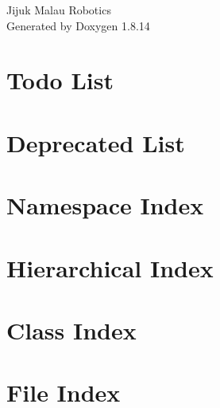 \documentclass[twoside]{book}
\newcommand{\+}{\discretionary{\mbox{\scriptsize$\hookleftarrow$}}{}{}}
\newcommand{\clearemptydoublepage}{%
  \newpage{\pagestyle{empty}\cleardoublepage}%
}
\begin{document}
\hypersetup{pageanchor=false,
             bookmarksnumbered=true,
             pdfencoding=unicode
            }
\begin{titlepage}
\vspace*{7cm}
\begin{center}%
{\Large Jijuk Malau Robotics }\\
\vspace*{1cm}
{\large Generated by Doxygen 1.8.14}\\
\end{center}
\end{titlepage}
\clearemptydoublepage
{}
\tableofcontents
\clearemptydoublepage
{}
\hypersetup{pageanchor=true}

\chapter{Todo List}
\label{todo}

\chapter{Deprecated List}
\label{deprecated}

\chapter{Namespace Index}

\chapter{Hierarchical Index}

\chapter{Class Index}

\chapter{File Index}

\end{document}
